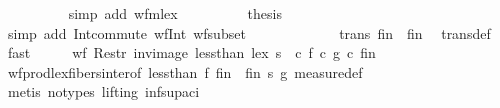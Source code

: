 \begin{isabellebody}
\ \ \ \ \ \ \ \ \isamarkupfalse%
\ {\isacharparenleft}{\kern0pt}simp\ add{\isacharcolon}{\kern0pt}\ wf{\isacharunderscore}{\kern0pt}mlex{\isacharparenright}{\kern0pt}\isanewline
\ \ \ \ \ \ \isamarkupfalse%
\ \isamarkupfalse%
\ {\isacharquery}{\kern0pt}thesis\ \isamarkupfalse%
\ {\isacharparenleft}{\kern0pt}simp\ add{\isacharcolon}{\kern0pt}\ Int{\isacharunderscore}{\kern0pt}commute\ wf{\isacharunderscore}{\kern0pt}Int{}\ wf{\isacharunderscore}{\kern0pt}subset{\isacharparenright}{\kern0pt}\isanewline
\ \ \ \ \isamarkupfalse%
\isanewline
\ \ \isamarkupfalse%
\isanewline
\ \ \isamarkupfalse%
\ \isamarkupfalse%
\ {\isachardoublequoteopen}trans\ {\isacharparenleft}{\kern0pt}{\isacharquery}{\kern0pt}fin\ {\isasymtimes}\ {\isacharquery}{\kern0pt}fin{\isacharparenright}{\kern0pt}{\isachardoublequoteclose}\ \isamarkupfalse%
\ trans{\isacharunderscore}{\kern0pt}def\ \isamarkupfalse%
\ fast\isanewline
\ \ \isamarkupfalse%
\ \isamarkupfalse%
\ {\isachardoublequoteopen}wf\ {\isacharparenleft}{\kern0pt}Restr\ {\isacharparenleft}{\kern0pt}inv{\isacharunderscore}{\kern0pt}image\ {\isacharparenleft}{\kern0pt}less{\isacharunderscore}{\kern0pt}than\ {\isacharless}{\kern0pt}{\isacharasterisk}{\kern0pt}lex{\isacharasterisk}{\kern0pt}{\isachargreater}{\kern0pt}\ s{\isacharparenright}{\kern0pt}\ {\isacharparenleft}{\kern0pt}{\isasymlambda}\ c{\isachardot}{\kern0pt}\ {\isacharparenleft}{\kern0pt}f\ c{\isacharcomma}{\kern0pt}\ g\ c{\isacharparenright}{\kern0pt}{\isacharparenright}{\kern0pt}{\isacharparenright}{\kern0pt}\ {\isacharquery}{\kern0pt}fin{\isacharparenright}{\kern0pt}{\isachardoublequoteclose}\ \isanewline
\ \ \ \ \isamarkupfalse%
\ wf{\isacharunderscore}{\kern0pt}prod{\isacharunderscore}{\kern0pt}lex{\isacharunderscore}{\kern0pt}fibers{\isacharunderscore}{\kern0pt}inter{\isacharbrackleft}{\kern0pt}of\ {\isachardoublequoteopen}less{\isacharunderscore}{\kern0pt}than{\isachardoublequoteclose}\ {\isachardoublequoteopen}f{\isachardoublequoteclose}\ {\isachardoublequoteopen}{\isacharquery}{\kern0pt}fin\ {\isasymtimes}\ {\isacharquery}{\kern0pt}fin{\isachardoublequoteclose}\ {\isachardoublequoteopen}s{\isachardoublequoteclose}\ {\isachardoublequoteopen}g{\isachardoublequoteclose}{\isacharbrackright}{\kern0pt}\ measure{\isacharunderscore}{\kern0pt}def\isanewline
\ \ \ \ \isamarkupfalse%
\ {\isacharparenleft}{\kern0pt}metis\ {\isacharparenleft}{\kern0pt}no{\isacharunderscore}{\kern0pt}types{\isacharcomma}{\kern0pt}\ lifting{\isacharparenright}{\kern0pt}\ inf{\isacharunderscore}{\kern0pt}sup{\isacharunderscore}{\kern0pt}aci{\isacharparenleft}{\kern0pt}{}{\isacharparenright}{\kern0pt}{\isacharparenright}{\kern0pt}\isanewline

\end{isabellebody}
